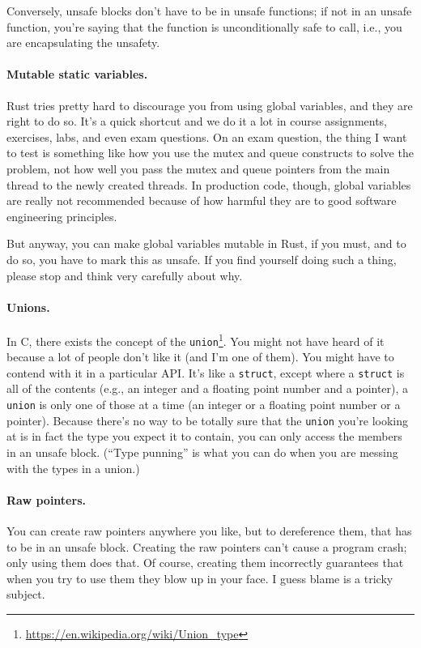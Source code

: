 Conversely, unsafe blocks don't have to be in unsafe functions; if not in an unsafe function, you're saying
that the function is unconditionally safe to call, i.e., you are encapsulating the unsafety.

\paragraph{Mutable static variables.} Rust tries pretty hard to discourage you from using global variables, and they are right to do so. It's a quick shortcut and we do it a lot in course assignments, exercises, labs, and even exam questions. On an exam question, the thing I want to test is something like how you use the mutex and queue constructs to solve the problem, not how well you pass the mutex and queue pointers from the main thread to the newly created threads. In production code, though, global variables are really not recommended because of how harmful they are to good software engineering principles. 

But anyway, you can make global variables mutable in Rust, if you must, and to do so, you have to mark this as unsafe. If you find yourself doing such a thing, please stop and think very carefully about why.

\paragraph{Unions.}
In C, there exists the concept of the \texttt{union}\footnote{\url{https://en.wikipedia.org/wiki/Union_type}}. You might not have heard of it because a lot of people don't like it (and I'm one of them). You might have to contend with it in a particular API. It's like a \texttt{struct}, except where a \texttt{struct} is all of the contents (e.g., an integer and a floating point number and a pointer), a \texttt{union} is only one of those at a time (an integer or a floating point number or a pointer). Because there's no way to be totally sure that the \texttt{union} you're looking at is in fact the type you expect it to contain, you can only access the members in an unsafe block. (``Type punning'' is what you can do when you are messing with the types in a union.)


\paragraph{Raw pointers.}
You can create raw pointers anywhere you like, but to dereference them, that has to be in an unsafe block. Creating the raw pointers can't cause a program crash; only using them does that. Of course, creating them incorrectly guarantees that when you try to use them they blow up in your face. I guess blame is a tricky subject.

